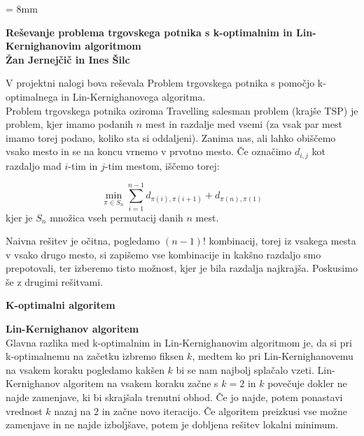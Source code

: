 \documentclass[a4paper,12pt]{article}
\begin{document}
\parindent = 8mm
\begin{center}
\textbf{Reševanje problema trgovskega potnika s k-optimalnim in Lin-Kernighanovim algoritmom}\\
\vspace{5 mm}
\textbf{Žan Jernejčič in Ines Šilc}
\end{center}

V projektni nalogi bova reševala Problem trgovskega potnika s pomočjo k-optimalnega in Lin-Kernighanovega algoritma.\\

Problem trgovskega potnika oziroma Travelling salesman problem (krajše TSP) je problem, kjer imamo podanih $n$ mest in razdalje med vsemi (za vsak par mest imamo torej podano, koliko sta si oddaljeni). Zanima nas, ali lahko obiščemo vsako mesto in se na koncu vrnemo v prvotno mesto. Če označimo $d_{i, j}$ kot razdaljo mad $i$-tim in $j$-tim mestom, iščemo torej:

$$
\min_{\pi \in S_n} \sum\limits_{i=1}^{n-1} d_{\pi (i), \pi (i+1)} + d_{\pi (n), \pi (1)}
$$
 kjer je $S_n$ množica vseh permutacij danih $n$ mest.
 
Naivna rešitev je očitna, pogledamo $(n-1)!$ kombinacij, torej iz vsakega mesta v vsako drugo mesto, si zapišemo vse kombinacije in kakšno razdaljo smo prepotovali, ter izberemo tisto možnost, kjer je bila razdalja najkrajša. Poskusimo še z drugimi rešitvami.

\vspace{5 mm}
\textbf{K-optimalni algoritem}




\vspace{5 mm}
\textbf{Lin-Kernighanov algoritem}\\

Glavna razlika med k-optimalnim in Lin-Kernighanovim algoritmom je, da si pri k-optimalnemu na začetku izbremo fiksen $k$, medtem ko pri Lin-Kernighanovemu na vsakem koraku pogledamo kakšen $k$ bi se nam najbolj splačalo vzeti. Lin-Kernighanov algoritem na vsakem koraku začne s $k=2$ in $k$ povečuje dokler ne najde zamenjave, ki bi skrajšala trenutni obhod. Če jo najde, potem ponastavi vrednost $k$ nazaj na $2$ in začne novo iteracijo. Če algoritem preizkusi vse možne zamenjave in ne najde izboljšave, potem je dobljena rešitev lokalni minimum. \\
\end{document}
